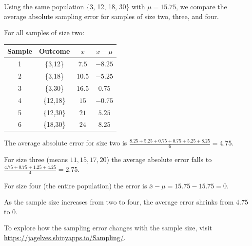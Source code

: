 \documentclass[
  11pt,
  letterpaper,
  DIV=11,
  numbers=noendperiod,
  oneside,
  open=any]{scrreprt}
\begin{document}
\begin{bsexample}[Example]

Using the same population \{3, 12, 18, 30\} with \(\mu = 15.75\), we
compare the average absolute sampling error for samples of size two,
three, and four.

For all samples of size two:

\begin{center}
\begin{tabular}{cccc}
\toprule
Sample & Outcome & \(\bar{x}\) & \(\bar{x} - \mu\) \\
\midrule
1 & \{3,12\} & \(7.5\) & \(-8.25\) \\
2 & \{3,18\} & \(10.5\) & \(-5.25\) \\
3 & \{3,30\} & \(16.5\) & \(0.75\) \\
4 & \{12,18\} & \(15\) & \(-0.75\) \\
5 & \{12,30\} & \(21\) & \(5.25\) \\
6 & \{18,30\} & \(24\) & \(8.25\) \\
\bottomrule
\end{tabular}
\end{center}

The average absolute error for size two is
\(\frac{8.25 + 5.25 + 0.75 + 0.75 + 5.25 + 8.25}{6} = 4.75\).

For size three (means \(11, 15, 17, 20\)) the average absolute error
falls to \(\frac{4.75 + 0.75 + 1.25 + 4.25}{4} = 2.75\).

For size four (the entire population) the error is
\(\bar{x} - \mu = 15.75 - 15.75 = 0\).

As the sample size increases from two to four, the average error shrinks
from \(4.75\) to \(0\).

\end{bsexample}

\begin{tcolorbox}[enhanced jigsaw, breakable, left=2mm, title=\textcolor{quarto-callout-note-color}{\faInfo}\hspace{0.5em}{Note}, coltitle=black, colframe=quarto-callout-note-color-frame, rightrule=.15mm, toprule=.15mm, arc=.35mm, opacityback=0, titlerule=0mm, bottomtitle=1mm, toptitle=1mm, colback=white, colbacktitle=quarto-callout-note-color!10!white, opacitybacktitle=0.6, leftrule=.75mm, bottomrule=.15mm]

To explore how the sampling error changes with the sample size, visit
\url{https://jagelves.shinyapps.io/Sampling/}.

\end{tcolorbox}
\end{document}
